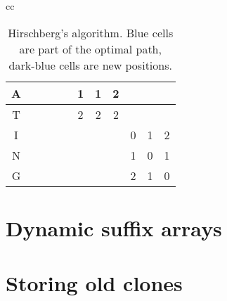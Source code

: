 \begin{table}
\begin{center}
\begin{tabular}[c]{cc}
{\begin{tabular}[c]{c|c|c|c|c|c|c|c|c|c|c|}
				A &                     &                     &                     &                       & \cellcolor{green!25}1 & \cellcolor{blue!75}1  & \cellcolor{green!25}2 &                       &                       &                       \\\hline
				T &                     &                     &                     &                       & \cellcolor{green!25}2 & \cellcolor{green!25}2 & \cellcolor{blue!25}2  &                       &                       &                       \\\hline
				I &                     &                     &                     &                       &                       &                       &                       & \cellcolor{blue!25}0  & \cellcolor{green!25}1 & \cellcolor{green!25}2 \\\hline
				N &                     &                     &                     &                       &                       &                       &                       & \cellcolor{green!25}1 & \cellcolor{blue!75}0  & \cellcolor{green!25}1 \\\hline
				G &                     &                     &                     &                       &                       &                       &                       & \cellcolor{green!25}2 & \cellcolor{green!25}1 & \cellcolor{blue!25}0  \\\hline
			\end{tabular}
		}
        \end{tabular}
	\end{center}
	\caption{Hirschberg's algorithm. Blue cells are part of the optimal path, dark-blue
    cells are new positions.}
	\label{tab:hirschbergs}
\end{table}

\section{Dynamic suffix arrays}

\section{Storing old clones}
